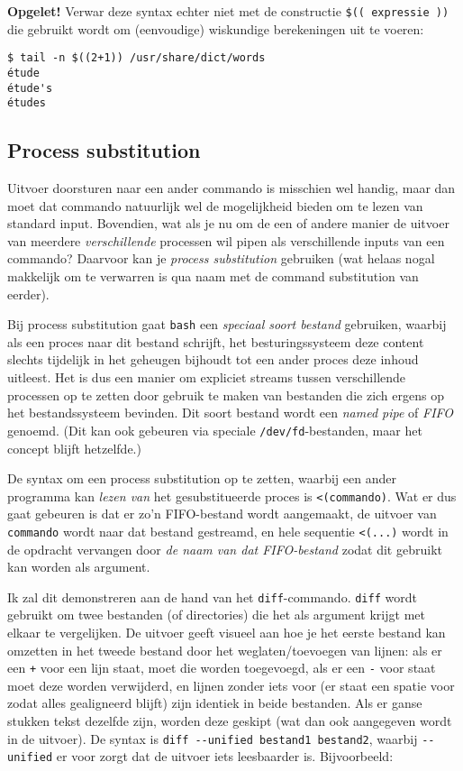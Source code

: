 \documentclass[a4paper,twoside,openany]{memoir}
\begin{document}
\textbf{Opgelet!} Verwar deze syntax echter niet met de constructie \verb!$(( expressie ))! die gebruikt wordt om (eenvoudige) wiskundige berekeningen uit te voeren:
\begin{verbatim}
$ tail -n $((2+1)) /usr/share/dict/words
étude
étude's
études
\end{verbatim}

\subsection{Process substitution}

Uitvoer doorsturen naar een ander commando is misschien wel handig, maar dan moet dat
commando natuurlijk wel de mogelijkheid bieden om te lezen van standard input.
Bovendien, wat als je nu om de een of andere manier de uitvoer van meerdere
\emph{verschillende} processen wil pipen als verschillende inputs van een
commando? Daarvoor kan je \emph{process substitution} gebruiken (wat helaas
nogal makkelijk om te verwarren is qua naam met de command substitution van
eerder).

Bij process substitution gaat \verb!bash! een \emph{speciaal soort bestand}
gebruiken, waarbij als een proces naar dit bestand schrijft, het
besturingssysteem deze content slechts tijdelijk in het geheugen bijhoudt tot
een ander proces deze inhoud uitleest. Het is dus een manier om expliciet
streams tussen verschillende processen op te zetten door gebruik te maken van
bestanden die zich ergens op het bestandssysteem bevinden. Dit soort bestand
wordt een \emph{named pipe} of \emph{FIFO} genoemd. (Dit kan ook gebeuren via
speciale \verb!/dev/fd!-bestanden, maar het concept blijft hetzelfde.)

De syntax om een process substitution op te zetten, waarbij een ander programma
kan \emph{lezen van} het gesubstitueerde proces is \verb!<(commando)!. Wat er
dus gaat gebeuren is dat er zo'n FIFO-bestand wordt aangemaakt, de uitvoer van
\verb!commando! wordt naar dat bestand gestreamd, en hele sequentie
\verb!<(...)! wordt in de opdracht vervangen door \emph{de naam van dat
FIFO-bestand} zodat dit gebruikt kan worden als argument.

Ik zal dit demonstreren aan de hand van het \verb!diff!-commando. \verb!diff!
wordt gebruikt om twee bestanden (of directories) die het als argument krijgt
met elkaar te vergelijken. De uitvoer geeft visueel aan hoe je het eerste
bestand kan omzetten in het tweede bestand door het weglaten/toevoegen van
lijnen: als er een \verb!+! voor een lijn staat, moet die worden toegevoegd,
als er een \verb!-! voor staat moet deze worden verwijderd, en lijnen zonder
iets voor (er staat een spatie voor zodat alles gealigneerd blijft) zijn
identiek in beide bestanden. Als er ganse stukken tekst dezelfde zijn, worden
deze geskipt (wat dan ook aangegeven wordt in de uitvoer). De syntax is
\verb!diff --unified bestand1 bestand2!, waarbij \verb!--unified! er voor zorgt
dat de uitvoer iets leesbaarder is. Bijvoorbeeld:
\end{document}
